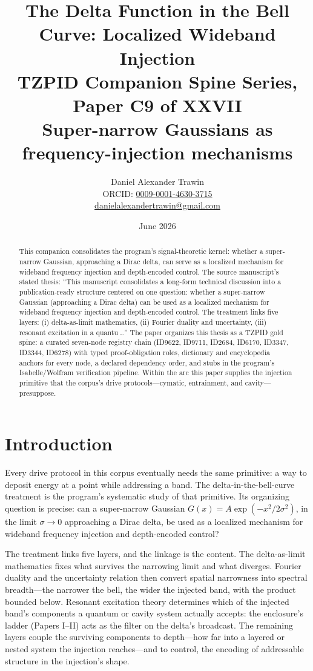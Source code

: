 \documentclass[11pt]{article}
\title{The Delta Function in the Bell Curve: Localized Wideband Injection\\[0.6em]
\large TZPID Companion Spine Series, Paper C9 of XXVII\\
\normalsize Super-narrow Gaussians as frequency-injection mechanisms}
\author{Daniel Alexander Trawin\\
\small ORCID: \href{https://orcid.org/0009-0001-4630-3715}{0009-0001-4630-3715}\\
\small \href{mailto:danielalexandertrawin@gmail.com}{danielalexandertrawin@gmail.com}}
\date{June 2026}
\theoremstyle{remark}
\begin{document}
\maketitle

\begin{abstract}
This companion consolidates the program's signal-theoretic kernel: whether a super-narrow Gaussian, approaching a Dirac delta, can serve as a localized mechanism for wideband frequency injection and depth-encoded control.
The source manuscript's stated thesis: ``This manuscript consolidates a long-form technical discussion into a publication-ready structure centered on one question: whether a super-narrow Gaussian (approaching a Dirac delta) can be used as a localized mechanism for wideband frequency injection and depth-encoded control. The treatment links five layers: (i) delta-as-limit mathematics, (ii) Fourier duality and uncertainty, (iii) resonant excitation in a quantu\,\ldots'' The paper organizes this thesis as a TZPID gold spine: a curated seven-node registry chain (ID9622, ID9711, ID2684, ID6170, ID3347, ID3344, ID6278) with typed proof-obligation roles, dictionary and encyclopedia anchors for every node, a declared dependency order, and stubs in the program's Isabelle/Wolfram verification pipeline. Within the arc this paper supplies the injection primitive that the corpus's drive protocols---cymatic, entrainment, and cavity---presuppose.
\end{abstract}

\section{Introduction}
\label{sec:intro}

Every drive protocol in this corpus eventually needs the same primitive: a way to deposit energy at a point while addressing a band. The delta-in-the-bell-curve treatment is the program's systematic study of that primitive. Its organizing question is precise: can a super-narrow Gaussian $G(x) = A\exp(-x^2/2\sigma^2)$, in the limit $\sigma \to 0$ approaching a Dirac delta, be used as a localized mechanism for wideband frequency injection and depth-encoded control?

The treatment links five layers, and the linkage is the content. The delta-as-limit mathematics fixes what survives the narrowing limit and what diverges. Fourier duality and the uncertainty relation then convert spatial narrowness into spectral breadth---the narrower the bell, the wider the injected band, with the product bounded below. Resonant excitation theory determines which of the injected band's components a quantum or cavity system actually accepts: the enclosure's ladder (Papers I--II) acts as the filter on the delta's broadcast. The remaining layers couple the surviving components to depth---how far into a layered or nested system the injection reaches---and to control, the encoding of addressable structure in the injection's shape.
\end{document}
